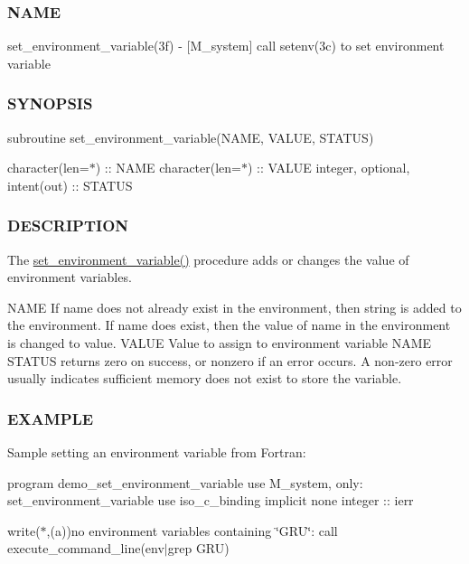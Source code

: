 \subsubsection*{N\+A\+ME}

set\+\_\+environment\+\_\+variable(3f) -\/ \mbox{[}M\+\_\+system\mbox{]} call setenv(3c) to set environment variable \subsubsection*{S\+Y\+N\+O\+P\+S\+IS}

subroutine set\+\_\+environment\+\_\+variable(\+N\+A\+M\+E, V\+A\+L\+U\+E, S\+T\+A\+T\+U\+S)

character(len=$\ast$) \+:\+: N\+A\+ME character(len=$\ast$) \+:\+: V\+A\+L\+UE integer, optional, intent(out) \+:\+: S\+T\+A\+T\+US \subsubsection*{D\+E\+S\+C\+R\+I\+P\+T\+I\+ON}

The \hyperlink{namespacem__system_ad813765403a5d9d6fb7a2edcb669fe4b}{set\+\_\+environment\+\_\+variable()} procedure adds or changes the value of environment variables.

N\+A\+ME If name does not already exist in the environment, then string is added to the environment. If name does exist, then the value of name in the environment is changed to value. V\+A\+L\+UE Value to assign to environment variable N\+A\+ME S\+T\+A\+T\+US returns zero on success, or nonzero if an error occurs. A non-\/zero error usually indicates sufficient memory does not exist to store the variable.

\subsubsection*{E\+X\+A\+M\+P\+LE}

Sample setting an environment variable from Fortran\+:

program demo\+\_\+set\+\_\+environment\+\_\+variable use M\+\_\+system, only\+: set\+\_\+environment\+\_\+variable use iso\+\_\+c\+\_\+binding implicit none integer \+:\+: ierr

write($\ast$,\textquotesingle{}(a)\textquotesingle{})\textquotesingle{}no environment variables containing \char`\"{}\+G\+R\+U\char`\"{}\+:\textquotesingle{} call execute\+\_\+command\+\_\+line(\textquotesingle{}env$\vert$grep G\+RU\textquotesingle{})

